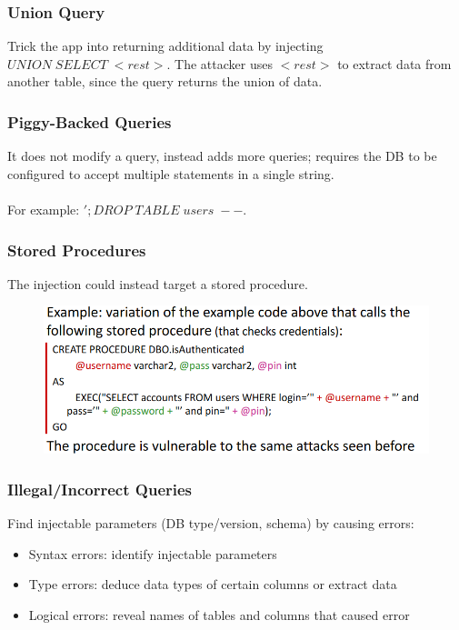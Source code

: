 \documentclass[10pt,a4paper]{report}
\begin{document}
\subsubsection{Union Query}
Trick the app into returning additional data by injecting $UNION \; SELECT  \; <rest>$. The attacker uses $<rest>$ to extract data from another table, since the query returns the union of data.
\subsubsection{Piggy-Backed Queries}
It does not modify a query, instead adds more queries; requires the DB to be configured to accept multiple statements in a single string.\\
\\
For example: $';DROP \; TABLE \; users\;--$.
\subsubsection{Stored Procedures}
The injection could instead target a stored procedure.
\begin{figure}[H]
\centering
\includegraphics[scale=0.4]{9.png}
\end{figure}
\subsubsection{Illegal/Incorrect Queries}
Find injectable parameters (DB type/version, schema) by causing errors:
\begin{itemize}
\item Syntax errors: identify injectable parameters
\item Type errors: deduce data types of certain columns or extract data
\item Logical errors: reveal names of tables and columns that caused error
\end{itemize}
\end{document}
